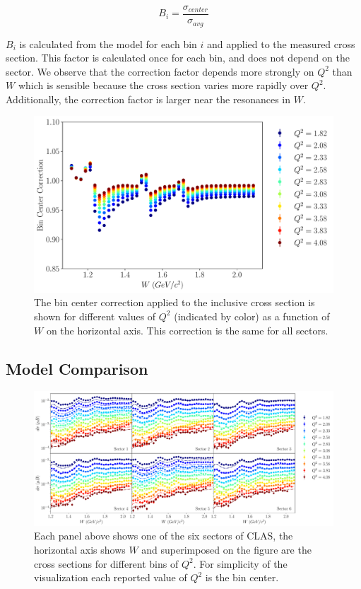 \begin{equation}
	B_{i} = \frac{\sigma_{center}}{\sigma_{avg}}
\end{equation}

$B_i$ is calculated from the model for each bin $i$ and applied to the measured cross section.  This factor is calculated once for each bin, and does not depend on the sector.  We observe that the correction factor depends more strongly on $Q^2$ than $W$ which is sensible because the cross section varies more rapidly over $Q^2$.  Additionally, the correction factor is larger near the resonances in $W$.

\begin{figure}
	\centering
	\label{fig-bin-centering-correction} 
	\includegraphics[width=14cm]{image/plots/inclusive/bin_center_correction.pdf}
	\caption{The bin center correction applied to the inclusive cross section is shown for different values of $Q^2$ (indicated by color) as a function of $W$ on the horizontal axis.   This correction is the same for all sectors.}
\end{figure}

\subsection{Model Comparison}

\begin{figure}
	\centering
	\label{fig-inclusve-xs} 
	\includegraphics[width=\textwidth]{image/plots/inclusive/inclusive_xs.pdf}
	\caption{Each panel above shows one of the six sectors of CLAS, the horizontal axis shows $W$ and superimposed on the figure are the cross sections for different bins of $Q^2$.  For simplicity of the visualization each reported value of $Q^2$ is the bin center.}
\end{figure}

